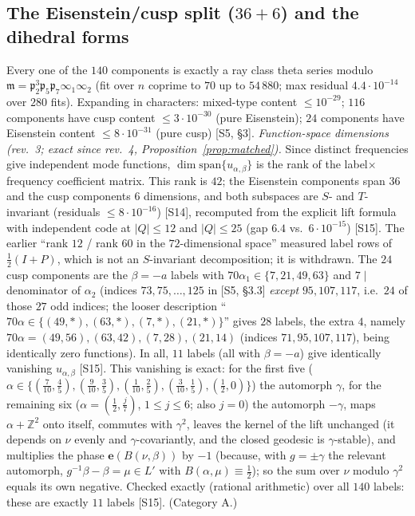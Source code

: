 \documentclass[11pt]{article}
\theoremstyle{definition}
\newcommand{\Z}{\mathbb{Z}}
\newcommand{\e}{\mathbf{e}}
\newcommand{\fp}{\mathfrak{p}}
\newcommand{\fm}{\mathfrak{m}}
\newcommand{\src}[1]{\textup{[S#1]}}
\begin{document}
\subsection{\texorpdfstring{The Eisenstein/cusp split ($36+6$) and the dihedral forms}{The Eisenstein/cusp split (36+6) and the dihedral forms}}
Every one of the $140$ components is exactly a ray class theta series modulo $\fm=\fp_2^3\fp_5\fp_7\infty_1\infty_2$ (fit over $n$ coprime to $70$
up to $54\,880$; max residual $4.4\cdot10^{-14}$ over $280$ fits). Expanding in characters: mixed-type content $\le10^{-29}$; $116$ components have
cusp content $\le3\cdot10^{-30}$ (pure Eisenstein); $24$ components have Eisenstein content $\le8\cdot10^{-31}$ (pure cusp) \src{5, \S3}.
\emph{Function-space dimensions (rev.~3; exact since rev.~4, Proposition~\ref{prop:matched}).} Since distinct frequencies give independent mode functions, $\dim\mathrm{span}\{u_{\alpha,\beta}\}$ is the rank of the
label$\times$frequency coefficient matrix. This rank is $42$; the Eisenstein components span $36$ and the cusp components $6$ dimensions, and both
subspaces are $S$- and $T$-invariant (residuals $\le8\cdot10^{-16}$) \src{14}, recomputed from the explicit lift formula with independent code at
$|Q|\le12$ and $|Q|\le25$ (gap $6.4$ vs.\ $6\cdot10^{-15}$) \src{15}. The earlier ``rank $12$ / rank $60$ in the $72$-dimensional space'' measured label rows of
$\tfrac12(I+P)$, which is not an $S$-invariant decomposition; it is withdrawn.
The $24$ cusp components are the $\beta=-a$ labels with $70\alpha_1\in\{7,21,49,63\}$ and $7\mid$ denominator of $\alpha_2$ (indices $73,75,\dots,125$ in
\src{5, \S3.3} \emph{except} $95,107,117$, i.e.\ $24$ of those $27$ odd indices; the looser description ``$70\alpha\in\{(49,\ast),(63,\ast),(7,\ast),(21,\ast)\}$''
gives $28$ labels, the extra $4$, namely $70\alpha=(49,56),(63,42),(7,28),(21,14)$ (indices $71,95,107,117$), being identically zero functions). In all, $11$ labels (all with $\beta=-a$) give identically vanishing $u_{\alpha,\beta}$
\src{15}. This vanishing is exact: for the first five ($\alpha\in\{(\tfrac7{10},\tfrac45),(\tfrac9{10},\tfrac35),(\tfrac1{10},\tfrac25),(\tfrac3{10},\tfrac15),(\tfrac12,0)\}$) the
automorph $\gamma$, for the remaining six ($\alpha=(\tfrac12,\tfrac j7)$, $1\le j\le6$; also $j=0$) the automorph $-\gamma$, maps $\alpha+\Z^2$ onto itself, commutes
with $\gamma^2$, leaves the kernel of the lift unchanged (it depends on $\nu$ evenly and $\gamma$-covariantly, and the closed geodesic is $\gamma$-stable), and
multiplies the phase $\e(B(\nu,\beta))$ by $-1$ (because, with $g=\pm\gamma$ the relevant automorph, $g^{-1}\beta-\beta=\mu\in L'$ with $B(\alpha,\mu)\equiv\tfrac12$); so the sum over $\nu$ modulo
$\gamma^2$ equals its own negative. Checked exactly (rational arithmetic) over all $140$ labels: these are exactly $11$ labels \src{15}. (Category A.)
\end{document}
